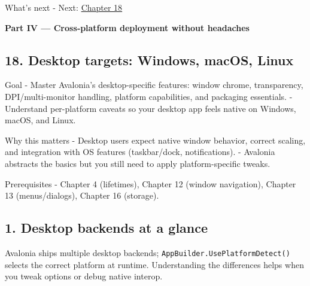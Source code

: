 What's next - Next: \href{Chapter18.md}{Chapter 18}

\clearpage
{}
{}
\thispagestyle{empty}
\vspace*{\fill}
\begin{center}
{\Huge\bfseries Part IV — Cross‑platform deployment without headaches}
\end{center}
\vspace*{\fill}
\clearpage

\newpage

\subsection{18. Desktop targets: Windows, macOS,
Linux}\label{desktop-targets-windows-macos-linux}

Goal - Master Avalonia's desktop-specific features: window chrome,
transparency, DPI/multi-monitor handling, platform capabilities, and
packaging essentials. - Understand per-platform caveats so your desktop
app feels native on Windows, macOS, and Linux.

Why this matters - Desktop users expect native window behavior, correct
scaling, and integration with OS features (taskbar/dock, notifications).
- Avalonia abstracts the basics but you still need to apply
platform-specific tweaks.

Prerequisites - Chapter 4 (lifetimes), Chapter 12 (window navigation),
Chapter 13 (menus/dialogs), Chapter 16 (storage).

\subsection{1. Desktop backends at a
glance}\label{desktop-backends-at-a-glance}

Avalonia ships multiple desktop backends;
\passthrough{\lstinline!AppBuilder.UsePlatformDetect()!} selects the
correct platform at runtime. Understanding the differences helps when
you tweak options or debug native interop.

